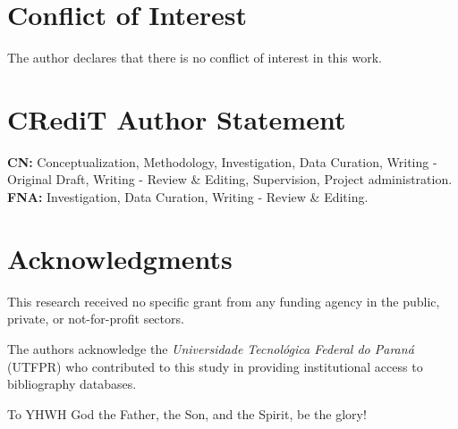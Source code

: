 
\section*{Conflict of Interest}

    The author declares that there is no conflict of interest in this work.



\section*{CRediT Author Statement}

    \textbf{CN:} Conceptualization, Methodology, Investigation, Data Curation, Writing - Original Draft,  Writing  -  Review  \&
    Editing, Supervision, Project administration. \textbf{FNA:} Investigation, Data Curation, Writing - Review \& Editing.



\section*{Acknowledgments}

    This research received no specific grant from any funding agency in the public, private, or not-for-profit sectors.

    The authors acknowledge the \textit{Universidade Tecnológica Federal do Paraná} (UTFPR) who contributed  to  this  study  in
    providing institutional access to bibliography databases.

    To YHWH God the Father, the Son, and the Spirit, be the glory!




